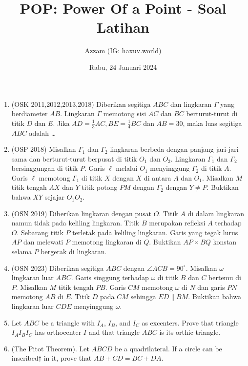 \documentclass[12pt]{scrartcl}
\title{POP: Power Of a Point - Soal Latihan}
\author{Azzam (IG: haxuv.world)}
\date{Rabu, 24 Januari 2024}
\begin{document}
\maketitle

\renewcommand*\contentsname{Daftar Isi}
\tableofcontents

\newpage
\begin{enumerate}
    \item (OSK 2011,2012,2013,2018) Diberikan segitiga $ABC$ dan lingkaran $\Gamma$ yang berdiameter $AB$. Lingkaran $\Gamma$ memotong sisi $AC$ dan $BC$ berturut-turut di titik $D$ dan $E$. Jika $AD = \frac13 AC, BE =\frac14 BC$ dan $AB = 30$, maka luas segitiga $ABC$ adalah \dots

    \item (OSP 2018) Misalkan $\Gamma_1$ dan $\Gamma_2$ lingkaran berbeda dengan panjang jari-jari sama dan berturut-turut berpusat di titik $O_1$ dan $O_2$. Lingkaran $\Gamma_1$ dan $\Gamma_2$ bersinggungan di titik $P$. Garis $\ell$ melalui $O_1$ menyinggung $\Gamma_2$ di titik $A$. Garis $\ell$ memotong $\Gamma_1$ di titik $X$ dengan $X$ di antara $A$ dan $O_1$. Misalkan $M$ titik tengah $AX$ dan $Y$ titik potong $PM$ dengan $\Gamma_2$ dengan $Y \neq P$. Buktikan bahwa $XY$ sejajar $O_1O_2$.
    
    \item (OSN 2019) Diberikan lingkaran dengan pusat $O$. Titik $A$ di dalam lingkaran namun tidak pada keliling lingkaran. Titik $B$ merupakan refleksi $A$ terhadap $O$. Sebarang titik $P$ terletak pada keliling lingkaran. Garis yang tegak lurus $AP$ dan melewati $P$ memotong lingkaran di $Q$. Buktikan $AP \times BQ$ konstan selama $P$ bergerak di lingkaran.
    
    \item (OSN 2023) Diberikan segitiga $ABC$ dengan $\angle ACB = 90^\circ$. Misalkan $\omega$ lingkaran luar $ABC$. Garis singgung terhadap $\omega$ di titik $B$ dan $C$ bertemu di $P$. Misalkan $M$ titik tengah $PB$. Garis $CM$ memotong $\omega$ di $N$ dan garis $PN$ memotong $AB$ di $E$. Titik $D$ pada $CM$ sehingga $ED \parallel BM$. Buktikan bahwa lingkaran luar $CDE$ menyinggung $\omega$.

    \item Let $ABC$ be a triangle with $I_A$, $I_B$, and $I_C$ as excenters. Prove that triangle $I_AI_BI_C$ has orthocenter $I$ and that triangle $ABC$ is its orthic triangle.
    
    \item (The Pitot Theorem). Let $ABCD$ be a quadrilateral. If a circle can be inscribed† in it, prove that $AB + CD = BC + DA$.
    

\end{enumerate}
\end{document}
